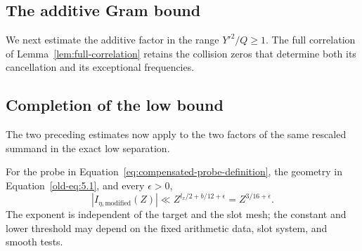 \subsection{The additive Gram bound}

We next estimate the additive factor in the range $Y'^2/Q\ge1$.  The
full correlation of Lemma~\ref{lem:full-correlation} retains the collision
zeros that determine both its cancellation and its exceptional frequencies.

\begin{proposition}\label{prop:probe-gram}
\subsection{Completion of the low bound}

The two preceding estimates now apply to the two factors of the same
rescaled summand in the exact low separation.

\begin{proposition}\label{prop:probe-low}
For the probe in Equation~\eqref{eq:compensated-probe-definition},
the geometry in Equation~\eqref{old-eq:5.1}, and every
$\epsilon>0$,
\begin{equation}
 |I_{\eta,\mathrm{modified}}(Z)|
       \ll Z^{l_x/2+b/12+\epsilon}=Z^{3/16+\epsilon}.
 \label{old-eq:5.10}
\end{equation}
The exponent is independent of the target and the slot mesh; the
constant and lower threshold may depend on the fixed arithmetic
data, slot system, and smooth tests.
\end{proposition}


\end{proposition}
